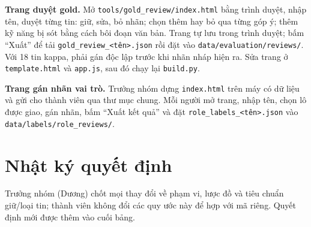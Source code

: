 \documentclass[12pt]{article}
\newcommand{\code}[1]{\texttt{#1}}
\begin{document}
\textbf{Trang duyệt gold.} Mở \code{tools/gold\_review/index.html} bằng trình duyệt, nhập tên, duyệt từng tin: giữ, sửa, bỏ nhãn; chọn thêm hay bỏ qua từng góp ý; thêm kỹ năng bị sót bằng cách bôi đoạn văn bản. Trang tự lưu trong trình duyệt; bấm ``Xuất'' để tải \code{gold\_review\_<tên>.json} rồi đặt vào \code{data/evaluation/reviews/}. Với 18 tin kappa, phải gán độc lập trước khi nhãn nháp hiện ra. Sửa trang ở \code{template.html} và \code{app.js}, sau đó chạy lại \code{build.py}.

\textbf{Trang gán nhãn vai trò.} Trưởng nhóm dựng \code{index.html} trên máy có dữ liệu và gửi cho thành viên qua thư mục chung. Mỗi người mở trang, nhập tên, chọn lô được giao, gán nhãn, bấm ``Xuất kết quả'' và đặt \code{role\_labels\_<tên>.json} vào \code{data/labels/role\_reviews/}.

\section{Nhật ký quyết định}
\label{app:decisions}
Trưởng nhóm (Dương) chốt mọi thay đổi về phạm vi, lược đồ và tiêu chuẩn giữ/loại tin; thành viên không đổi các quy ước này để hợp với mã riêng. Quyết định mới được thêm vào cuối bảng.
\end{document}
